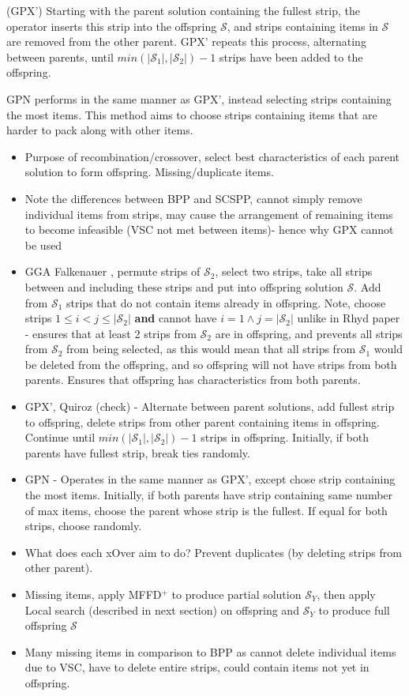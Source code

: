\documentclass{elsarticle}
\begin{document}
(GPX') Starting with the parent solution containing the fullest strip, the operator inserts this strip into the offspring $\mathcal{S}$, and strips containing items in $\mathcal{S}$ are removed from the other parent. GPX' repeats this process, alternating between parents, until $min (|\mathcal{S}_1|,|\mathcal{S}_2|) - 1$ strips have been added to the offspring.

GPN performs in the same manner as GPX', instead selecting strips containing the most items. This method aims to choose strips containing items that are harder to pack along with other items.

\begin{itemize}
	\item Purpose of recombination/crossover, select best characteristics of each parent solution to form offspring. Missing/duplicate items.
	\item Note the differences between BPP and SCSPP, cannot simply remove individual items from strips, may cause the arrangement of remaining items to become infeasible (VSC not met between items)- hence why GPX cannot be used \cite{lewis2017}
	\item GGA Falkenauer \cite{falkenauer1992}, permute strips of $\mathcal{S}_2$, select two strips, take all strips between and including these strips and put into offspring solution $\mathcal{S}$. Add from $\mathcal{S}_1$ strips that do not contain items already in offspring. Note, choose strips $1 \leq i < j \leq |\mathcal{S}_2|$ \textbf{and} cannot have $i = 1 \land j = |\mathcal{S}_2|$ unlike in Rhyd paper - ensures that at least 2 strips from $\mathcal{S}_2$ are in offspring, and prevents all strips from $\mathcal{S}_2$ from being selected, as this would mean that all strips from $\mathcal{S}_1$ would be deleted from the offspring, and so offspring will not have strips from both parents. Ensures that offspring has characteristics from both parents.
	\item GPX', Quiroz \cite{quiroz2015} (check) - Alternate between parent solutions, add fullest strip to offspring, delete strips from other parent containing items in offspring. Continue until $min(|\mathcal{S}_1|,|\mathcal{S}_2|)-1$ strips in offspring. Initially, if both parents have fullest strip, break ties randomly.
	\item GPN - Operates in the same manner as GPX', except chose strip containing the most items. Initially, if both parents have strip containing same number of max items, choose the parent whose strip is the fullest. If equal for both strips, choose randomly.
	\item What does each xOver aim to do? Prevent duplicates (by deleting strips from other parent).
	\item Missing items, apply MFFD$^+$ to produce partial solution $\mathcal{S}_Y$, then apply Local search (described in next section) on offspring and $\mathcal{S}_Y$ to produce full offspring $\mathcal{S}$
	\item Many missing items in comparison to BPP as cannot delete individual items due to VSC, have to delete entire strips, could contain items not yet in offspring.
\end{itemize}
\end{document}
